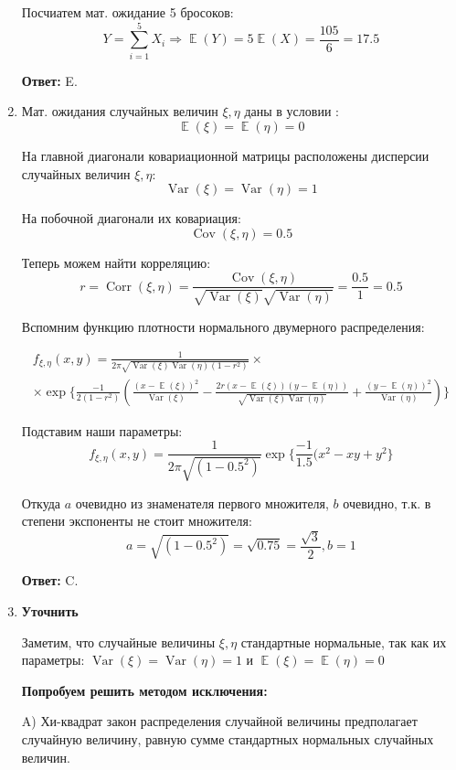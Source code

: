 \documentclass[a4paper]{article} %
\DeclareMathOperator{\Var}{Var}
\DeclareMathOperator{\Cov}{Cov}
\DeclareMathOperator{\Corr}{Corr}
\DeclareMathOperator{\E}{\mathbb{E}}
\begin{document}
\begin{enumerate}
    Посчиатем мат. ожидание 5 бросоков:
    \[
    Y = \sum_{i=1}^5 X_i \Rightarrow \E(Y) = 5\E(X) = \frac{105}{6} = 17.5
    \]
    
    \textbf{Ответ:} E.
    
    
    \item
    Мат. ожидания случайных величин $\xi, \eta $ даны в условии :
    \[
    \E(\xi) = \E(\eta) = 0
    \]
    
    На главной диагонали ковариационной матрицы расположены дисперсии случайных величин $\xi, \eta $: 
    \[
    \Var(\xi) = \Var(\eta) = 1
    \]
    
    На побочной диагонали их ковариация: 
    \[
    \Cov(\xi, \eta) = 0.5
    \]
    
    Теперь можем найти корреляцию:
    \[
    r = \Corr(\xi, \eta) = \frac{\Cov(\xi, \eta)}{\sqrt{\Var(\xi)}\sqrt{\Var(\eta)}} = \frac{0.5}{1} = 0.5
    \]
    
    Вспомним функцию плотности нормального двумерного распределения:
    
    \[
    \begin{gathered} f_{\xi, \eta}(x,y) = \frac{1}{2\pi\sqrt{\Var(\xi)\Var(\eta)(1-r^2)}} \times \\ 
    \times \exp{\{\frac{-1}{2(1-r^2)}(\frac{(x-\E(\xi))^2}{\Var(\xi)}-\frac{2r(x-\E(\xi))(y-\E(\eta))}{\sqrt{\Var(\xi)\Var(\eta)}}+\frac{(y-\E(\eta))^2}{\Var(\eta)})\}} \end{gathered}
    \]
    
    Подставим наши параметры:
    \[
    f_{\xi, \eta}(x,y) = \frac{1}{2\pi\sqrt{(1-0.5^2)}} \exp{\{\frac{-1}{1.5}(x^2-xy+y^2\}}
    \]
    
    Откуда $a$ очевидно из знаменателя первого множителя, $b$ очевидно, т.к. в степени экспоненты не стоит множителя:
    \[
    a = \sqrt{(1-0.5^2)} = \sqrt{0.75} = \frac{\sqrt{3}}{2}, b=1
    \] 
    
    \textbf{Ответ:} C.
    
    
    \item
    \textbf{Уточнить}
    
    Заметим, что случайные величины $\xi, \eta $ стандартные нормальные, так как их параметры: $\Var(\xi) = \Var(\eta) = 1$ и $\E(\xi) = \E(\eta) = 0$
    
    \textbf{Попробуем решить методом исключения:}
    
    A) Хи-квадрат закон распределения случайной величины предполагает случайную величину, равную сумме стандартных нормальных случайных величин.
    

\end{enumerate}
\end{document}
